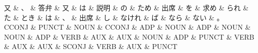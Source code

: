 \documentclass[tikz,border=5pt]{standalone}
\begin{document}
\normalsize
\begin{dependency}[edge unit distance=12.0pt]
    \begin{deptext}[column sep=1em]
        又 \& 、 \& 答弁 \& 又 \& は \& 説明 \& の \& ため \& 出席 \& を \& 求め \& られ \& た \& とき \& は \& 、 \& 出席 \& し \& なけれ \& ば \& なら \& ない \& 。\\
        CCONJ \& PUNCT \& NOUN \& CCONJ \& ADP \& NOUN \& ADP \& NOUN \& NOUN \& ADP \& VERB \& AUX \& AUX \& NOUN \& ADP \& PUNCT \& VERB \& AUX \& AUX \& SCONJ \& VERB \& AUX \& PUNCT\\
    \end{deptext}
\end{dependency}
\end{document}
